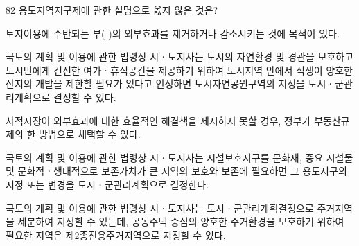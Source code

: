 \begin{question}{82}
용도지역지구제에 관한 설명으로 옳지 않은 것은?
\begin{choices}
  \item 토지이용에 수반되는 부(-)의 외부효과를 제거하거나 감소시키는 것에 목적이 있다.
  \item 국토의 계획 및 이용에 관한 법령상 시ㆍ도지사는 도시의 자연환경 및 경관을 보호하고 도시민에게 건전한 여가ㆍ휴식공간을 제공하기 위하여 도시지역 안에서 식생이 양호한 산지의 개발을 제한할 필요가 있다고 인정하면 도시자연공원구역의 지정을 도시ㆍ군관리계획으로 결정할 수 있다.
  \item 사적시장이 외부효과에 대한 효율적인 해결책을 제시하지 못할 경우, 정부가 부동산규제의 한 방법으로 채택할 수 있다.
  \item 국토의 계획 및 이용에 관한 법령상 시ㆍ도지사는 시설보호지구를 문화재, 중요 시설물 및 문화적ㆍ생태적으로 보존가치가 큰 지역의 보호와 보존에 필요하면 그 용도지구의 지정 또는 변경을 도시ㆍ군관리계획으로 결정한다.
  \item 국토의 계획 및 이용에 관한 법령상 시ㆍ도지사는 도시ㆍ군관리계획결정으로 주거지역을 세분하여 지정할 수 있는데, 공동주택 중심의 양호한 주거환경을 보호하기 위하여 필요한 지역은 제2종전용주거지역으로 지정할 수 있다.
\end{choices}
\end{question}
